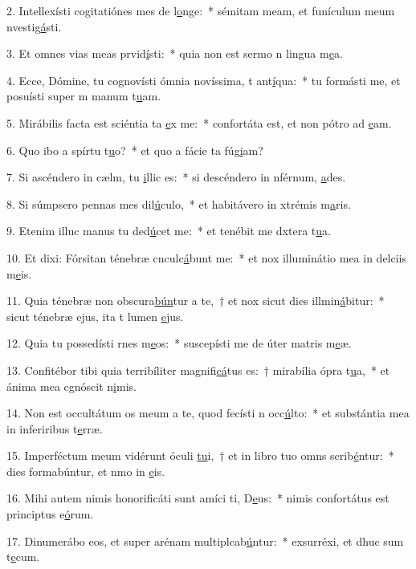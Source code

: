 2. Intellexísti cogitatiónes mes de l\uline{o}nge:~* sémitam meam, et funículum meum nvestig\uline{á}sti.\par 
3. Et omnes vias meas prvid\uline{í}sti:~* quia non est sermo n lingua m\uline{e}a.\par 
4. Ecce, Dómine, tu cognovísti ómnia novíssima, t ant\uline{í}qua:~* tu formásti me, et posuísti super m manum t\uline{u}am.\par 
5. Mirábilis facta est sciéntia ta \uline{e}x me:~* confortáta est, et non pótro ad \uline{e}am.\par 
6. Quo ibo a spírtu t\uline{u}o?~* et quo a fácie ta fúg\uline{i}am?\par 
7. Si ascéndero in cælm, tu \uline{i}llic es:~* si descéndero in nférnum, \uline{a}des.\par 
8. Si súmpsero pennas mes dil\uline{ú}culo,~* et habitávero in xtrémis m\uline{a}ris.\par 
9. Etenim illuc manus tu ded\uline{ú}cet me:~* et tenébit me dxtera t\uline{u}a.\par 
10. Et dixi: Fórsitan ténebræ cnculc\uline{á}bunt me:~* et nox illuminátio mea in delciis m\uline{e}is.\par 
11. Quia ténebræ non obscura\uline{bún}tur a te,~† et nox sicut dies illmin\uline{á}bitur:~* sicut ténebræ ejus, ita t lumen \uline{e}jus.\par 
12. Quia tu possedísti rnes m\uline{e}os:~* suscepísti me de úter matris m\uline{e}æ.\par 
13. Confitébor tibi quia terribíliter magnifi\uline{cá}tus es:~† mirabília ópra t\uline{u}a,~* et ánima mea cgnóscit n\uline{i}mis.\par 
14. Non est occultátum os meum a te, quod fecísti n occ\uline{ú}lto:~* et substántia mea in inferiribus t\uline{e}rræ.\par 
15. Imperféctum meum vidérunt óculi \uline{tu}i,~† et in libro tuo omns scrib\uline{é}ntur:~* dies formabúntur, et nmo in \uline{e}is.\par 
16. Mihi autem nimis honorificáti sunt amíci ti, D\uline{e}us:~* nimis confortátus est principtus e\uline{ó}rum.\par 
17. Dinumerábo eos, et super arénam multiplcab\uline{ú}ntur:~* exsurréxi, et dhuc sum t\uline{e}cum.\par 
